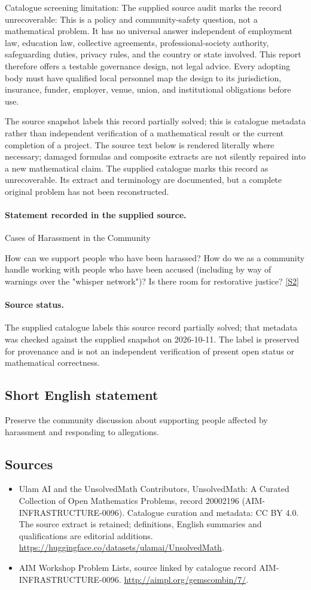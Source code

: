 \documentclass[11pt]{article}
\begin{document}
Catalogue screening limitation: The supplied source audit marks the record unrecoverable: This is a policy and community-safety question, not a mathematical problem. It has no universal answer independent of employment law, education law, collective agreements, professional-society authority, safeguarding duties, privacy rules, and the country or state involved. This report therefore offers a testable governance design, not legal advice. Every adopting body must have qualified local personnel map the design to its jurisdiction, insurance, funder, employer, venue, union, and institutional obligations before use.

The source snapshot labels this record partially solved; this is catalogue metadata rather than independent verification of a mathematical result or the current completion of a project.
The source text below is rendered literally where necessary; damaged formulas and composite extracts are not silently repaired into a new mathematical claim.
The supplied catalogue marks this record as unrecoverable. Its extract and terminology are documented, but a complete original problem has not been reconstructed.
\paragraph{Statement recorded in the supplied source.}
Cases of Harassment in the Community

How can we support people who have been harassed? How do we as a community handle working with people who have been accused (including by way of warnings over the "whisper network")? Is there room for restorative justice? \href{http://aimpl.org/gemscombin/7/}{[S2]}
\paragraph{Source status.}
The supplied catalogue labels this source record partially solved; that metadata was checked against the supplied snapshot on 2026-10-11. The label is preserved for provenance and is not an independent verification of present open status or mathematical correctness.
\subsection{Short English statement}
Preserve the community discussion about supporting people affected by harassment and responding to allegations.
\subsection{Sources}
\begin{itemize}
\item[S1] Ulam AI and the UnsolvedMath Contributors, UnsolvedMath: A Curated Collection of Open Mathematics Problems, record 20002196 (AIM-INFRASTRUCTURE-0096). Catalogue curation and metadata: CC BY 4.0. The source extract is retained; definitions, English summaries and qualifications are editorial additions.
\url{https://huggingface.co/datasets/ulamai/UnsolvedMath}.
\item[S2] AIM Workshop Problem Lists, source linked by catalogue record AIM-INFRASTRUCTURE-0096.
\url{http://aimpl.org/gemscombin/7/}.
\end{itemize}
\end{document}
